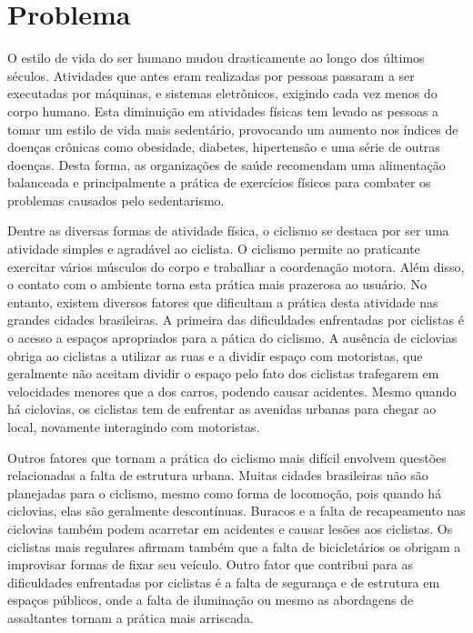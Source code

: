 \chapter[Problema]{Problema}

O estilo de vida do ser humano mudou drasticamente ao longo dos últimos séculos. Atividades que antes eram realizadas por pessoas passaram a ser executadas por máquinas, e sistemas eletrônicos, exigindo cada vez menos do corpo humano. Esta diminuição em atividades físicas tem levado as pessoas a tomar um estilo de vida mais sedentário, provocando um aumento nos índices de doenças crônicas como obesidade, diabetes, hipertensão e uma série de outras doenças. Desta forma, as organizações de saúde recomendam uma alimentação balanceada e principalmente a prática de exercícios físicos para combater os problemas causados pelo sedentarismo.

Dentre as diversas formas de atividade física, o ciclismo se destaca por ser uma atividade simples e agradável ao ciclista. O ciclismo permite ao praticante exercitar vários músculos do corpo e trabalhar a coordenação motora. Além disso, o contato com o ambiente torna esta prática mais prazerosa ao usuário. No entanto, existem diversos fatores que dificultam a prática desta atividade nas grandes cidades brasileiras.
A primeira das dificuldades enfrentadas por ciclistas é o acesso a espaços apropriados para a pática do ciclismo. A ausência de ciclovias obriga ao ciclistas a utilizar as ruas e a dividir espaço com motoristas, que geralmente não aceitam dividir o espaço pelo fato dos ciclistas trafegarem em velocidades menores que a dos carros, podendo causar acidentes. Mesmo quando há ciclovias, os ciclistas tem de enfrentar as avenidas urbanas para chegar ao local, novamente interagindo com motoristas.

Outros fatores que tornam a prática do ciclismo mais difícil envolvem questões relacionadas a falta de estrutura urbana. Muitas cidades brasileiras não são planejadas para o ciclismo, mesmo como forma de locomoção, pois quando há ciclovias, elas são geralmente descontínuas. Buracos e a falta de recapeamento nas ciclovias também podem acarretar em acidentes e causar lesões aos ciclistas. Os ciclistas mais regulares afirmam também que a falta de bicicletários os obrigam a improvisar formas de fixar seu veículo. Outro fator que contribui para as dificuldades enfrentadas por ciclistas é a falta de segurança e de estrutura em espaços públicos, onde a falta de iluminação ou mesmo as abordagens de assaltantes tornam a prática mais arriscada.

